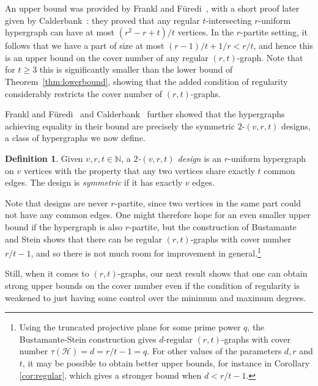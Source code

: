 \documentclass[a4paper,twoside,11pt]{article}
\numberwithin{thm}{section}
\theoremstyle{definition}
\newtheorem{dfn}[thm]{Definition}
\theoremstyle{remark}
\theoremstyle{definition}
\def\cH{{\mathcal H}}
\begin{document}
An upper bound was provided by Frankl and F\"uredi~\cite{frafur86}, with a short proof later given by Calderbank~\cite{calderbank87}: they proved that any regular $t$-intersecting $r$-uniform hypergraph can have at most $(r^2 - r + t)/t$ vertices. In the $r$-partite setting, it follows that we have a part of size at most $(r-1)/t + 1/r < r/t$, and hence this is an upper bound on the cover number of any regular $(r,t)$-graph. Note that for $t \ge 3$ this is significantly smaller than the lower bound of Theorem~\ref{thm:lowerbound}, showing that the added condition of regularity considerably restricts the cover number of $(r,t)$-graphs.

Frankl and F\"uredi~\cite{frafur86} and Calderbank~\cite{calderbank87} further showed that the hypergraphs achieving equality in their bound are precisely the symmetric $2$-$(v,r,t)$ designs, a class of hypergraphs we now define.

\begin{dfn} \label{def:design}
Given $v, r, t \in \mathbb{N}$, a \emph{$2$-$(v,r,t)$ design} is an $r$-uniform hypergraph on $v$ vertices with the property that any two vertices share exactly $t$ common edges. The design is \emph{symmetric} if it has exactly $v$ edges.
\end{dfn}

Note that designs are never $r$-partite, since two vertices in the same part could not have any common edges. One might therefore hope for an even smaller upper bound if the hypergraph is also $r$-partite, but the construction of Bustamante and Stein shows that there can be regular $(r,t)$-graphs with cover number $r/t - 1$, and so there is not much room for improvement in general.\footnote{Using the truncated projective plane for some prime power $q$, the Bustamante-Stein construction gives $d$-regular $(r,t)$-graphs with cover number $\tau(\cH)=d=r/t-1=q$. For other values of the parameters $d, r$ and $t$, it may be possible to obtain better upper bounds, for instance in Corollary \ref{cor:regular}, which gives a stronger bound when $d<r/t-1$. }

Still, when it comes to $(r,t)$-graphs, our next result shows that one can obtain strong upper bounds on the cover number even if the condition of regularity is weakened to just having some control over the minimum and maximum degrees.
\end{document}
